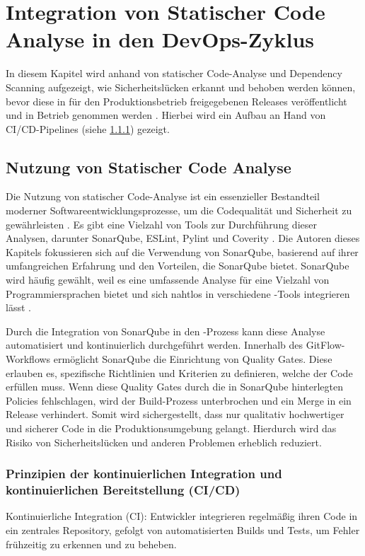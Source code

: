 \section{Integration von Statischer Code Analyse in den DevOps-Zyklus}
In diesem Kapitel wird anhand von statischer Code-Analyse und Dependency Scanning aufgezeigt, wie Sicherheitslücken erkannt und behoben werden können, bevor diese in für den Produktionsbetrieb freigegebenen Releases veröffentlicht und in Betrieb genommen werden \cite{vassallo2021continuous}. Hierbei wird ein Aufbau an Hand von CI/CD-Pipelines (siehe \ref{subsubsec:cicd}) gezeigt.

\subsection{Nutzung von Statischer Code Analyse}
Die Nutzung von statischer Code-Analyse ist ein essenzieller Bestandteil moderner Softwareentwicklungsprozesse, um die Codequalität und Sicherheit zu gewährleisten \cite{loukides2021software}. Es gibt eine Vielzahl von Tools zur Durchführung dieser Analysen, darunter SonarQube, ESLint, Pylint und Coverity \cite{vassallo2021continuous}. Die Autoren dieses Kapitels fokussieren sich auf die Verwendung von SonarQube, basierend auf ihrer umfangreichen Erfahrung und den Vorteilen, die SonarQube bietet. SonarQube wird häufig gewählt, weil es eine umfassende Analyse für eine Vielzahl von Programmiersprachen bietet und sich nahtlos in verschiedene -Tools integrieren lässt \cite{sonarqube2021docs}.

Durch die Integration von SonarQube in den -Prozess kann diese Analyse automatisiert und kontinuierlich durchgeführt werden. Innerhalb des GitFlow-Workflows ermöglicht SonarQube  die Einrichtung von Quality Gates. Diese erlauben es, spezifische Richtlinien und Kriterien zu definieren, welche der Code erfüllen muss. Wenn diese Quality Gates durch die in SonarQube hinterlegten Policies fehlschlagen, wird der Build-Prozess unterbrochen und ein Merge in ein Release verhindert. Somit wird sichergestellt, dass nur qualitativ hochwertiger und sicherer Code in die Produktionsumgebung gelangt. Hierdurch wird das Risiko von Sicherheitslücken und anderen Problemen erheblich reduziert.

\subsubsection{Prinzipien der kontinuierlichen Integration und kontinuierlichen Bereitstellung (CI/CD)}
\label{subsubsec:cicd}
Kontinuierliche Integration (CI): Entwickler integrieren regelmäßig ihren Code in ein zentrales Repository, gefolgt von automatisierten Builds und Tests, um Fehler frühzeitig zu erkennen und zu beheben.

